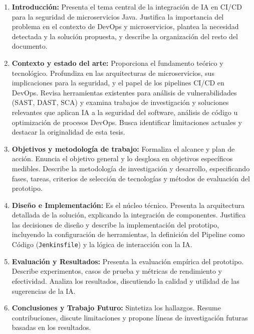 \begin{enumerate}
  \item \textbf{Introducción:} Presenta el tema central de la integración de IA en CI/CD para la seguridad de microservicios Java. Justifica la importancia del problema en el contexto de DevOps y microservicios, plantea la necesidad detectada y la solución propuesta, y describe la organización del resto del documento.

  \item \textbf{Contexto y estado del arte:} Proporciona el fundamento teórico y tecnológico. Profundiza en las arquitecturas de microservicios, sus implicaciones para la seguridad, y el papel de los pipelines CI/CD en DevOps. Revisa herramientas existentes para análisis de vulnerabilidades (SAST, DAST, SCA) y examina trabajos de investigación y soluciones relevantes que aplican IA a la seguridad del software, análisis de código u optimización de procesos DevOps. Busca identificar limitaciones actuales y destacar la originalidad de esta tesis.

  \item \textbf{Objetivos y metodología de trabajo:} Formaliza el alcance y plan de acción. Enuncia el objetivo general y lo desglosa en objetivos específicos medibles. Describe la metodología de investigación y desarrollo, especificando fases, tareas, criterios de selección de tecnologías y métodos de evaluación del prototipo.

  \item \textbf{Diseño e Implementación:} Es el núcleo técnico. Presenta la arquitectura detallada de la solución, explicando la integración de componentes. Justifica las decisiones de diseño y describe la implementación del prototipo, incluyendo la configuración de herramientas, la definición del Pipeline como Código (\texttt{Jenkinsfile}) y la lógica de interacción con la IA.

  \item \textbf{Evaluación y Resultados:} Presenta la evaluación empírica del prototipo. Describe experimentos, casos de prueba y métricas de rendimiento y efectividad. Analiza los resultados, discutiendo la calidad y utilidad de las sugerencias de la IA.

  \item \textbf{Conclusiones y Trabajo Futuro:} Sintetiza los hallazgos. Resume contribuciones, discute limitaciones y propone líneas de investigación futuras basadas en los resultados.
\end{enumerate}